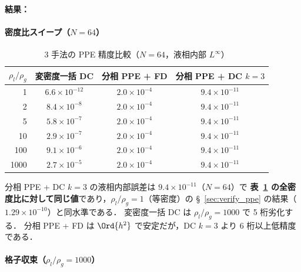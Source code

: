\noindent\textbf{結果：}

\paragraph{密度比スイープ（$N = 64$）}

\begin{table}[htbp]
\centering
\caption{3 手法の PPE 精度比較（$N = 64$，液相内部 $L^\infty$）}
\label{tab:split_ppe_dc_sweep}
\renewcommand{\arraystretch}{1.3}
\begin{tabular}{rccc}
\toprule
$\rho_l/\rho_g$ & 変密度一括 DC & 分相 PPE + FD & 分相 PPE + DC $k{=}3$ \\
\midrule
   1 & $6.6 \times 10^{-12}$  & $2.0 \times 10^{-4}$ & $9.4 \times 10^{-11}$ \\
   2 & $8.4 \times 10^{-8}$   & $2.0 \times 10^{-4}$ & $9.4 \times 10^{-11}$ \\
   5 & $5.8 \times 10^{-7}$   & $2.0 \times 10^{-4}$ & $9.4 \times 10^{-11}$ \\
  10 & $2.9 \times 10^{-7}$   & $2.0 \times 10^{-4}$ & $9.4 \times 10^{-11}$ \\
 100 & $9.1 \times 10^{-6}$   & $2.0 \times 10^{-4}$ & $9.4 \times 10^{-11}$ \\
1000 & $2.7 \times 10^{-5}$   & $2.0 \times 10^{-4}$ & $9.4 \times 10^{-11}$ \\
\bottomrule
\end{tabular}
\end{table}

分相 PPE + DC $k{=}3$ の液相内部誤差は $9.4 \times 10^{-11}$（$N = 64$）で
\textbf{表~\ref{tab:split_ppe_dc_sweep} の全密度比に対して同じ値}であり，$\rho_l/\rho_g = 1$（等密度）の
§~\ref{sec:verify_ppe} の結果（$1.29 \times 10^{-10}$）と同水準である．
変密度一括 DC は $\rho_l/\rho_g = 1000$ で 5 桁劣化する．
分相 PPE + FD は $\Ord{h^2}$ で安定だが，DC $k{=}3$ より 6 桁以上低精度である．

\paragraph{格子収束（$\rho_l/\rho_g = 1000$）}

